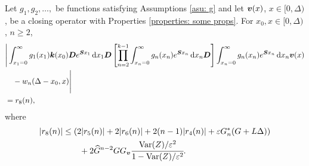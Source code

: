 \begin{cor}\label{cor: ahjg}
	Let \(g_1,g_2,\dots,\) be functions satisfying Assumptions \ref{asu: g} and let \({\boldsymbol v}(x)\), \(x\in[0,\Delta)\), be a closing operator with Properties \ref{properties: some props}. For \(x_0,x\in\mathcal [0,\Delta)\), \(n\geq 2\), 
	\begin{align}
		&\Bigg| \int_{x_1=0}^\infty g_1(x_1) \boldsymbol k(x_0) \boldsymbol D e^{\boldsymbol{S}x_1}\, \mathrm{d} x_1\boldsymbol D 
            	\left[\prod_{n=2}^{k-1}\int_{x_n=0}^\infty g_n(x_n) e^{\boldsymbol{S}x_n} \, \mathrm{d} x_n
		\boldsymbol D\right]
            	\int_{x_n=0}^\infty g_{n}(x_n) e^{\boldsymbol{S}x_n} \, \mathrm{d} x_n {\boldsymbol v}(x) \nonumber 
		\\&\quad{}- w_n(\Delta - x_0,x) \Bigg| \nonumber
		\\&= r_8(n),
	\end{align}
	where 
	\begin{align*}
	|r_8(n)|&\leq  \left( 2|r_5(n)| + 2|r_6(n)| + 2(n-1)|r_4(n)| + \varepsilon G_n^{*}(G+L\Delta) \right) \\&\qquad{}+ 2\widehat G^{n-2}GG_{\boldsymbol v}\cfrac{\mathrm{Var}(Z)/\varepsilon^2}{1-\mathrm{Var}(Z)/\varepsilon^2}.\end{align*}
\end{cor}
